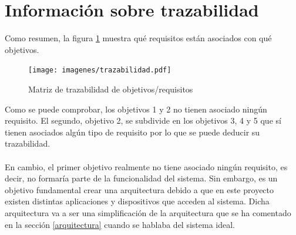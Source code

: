 \section{Información sobre trazabilidad}
Como resumen, la figura \ref{trazOBJ-R} muestra qué requisitos están asociados con qué objetivos.
\begin{figure}[H]
	\centering
	\texttt{[image: imagenes/trazabilidad.pdf]}
	\caption{Matriz de trazabilidad de objetivos/requisitos}
	\label{trazOBJ-R}
\end{figure}
Como se puede comprobar, los objetivos 1 y 2 no tienen asociado ningún requisito. El segundo, objetivo 2, se subdivide en los objetivos 3, 4 y 5 que sí tienen asociados algún tipo de requisito por lo que se puede deducir su trazabilidad. 
\\\\
En cambio, el primer objetivo realmente no tiene asociado ningún requisito, es decir, no formaría parte de la funcionalidad del sistema. Sin embargo, es un objetivo fundamental crear una arquitectura debido a que en este proyecto existen distintas aplicaciones y dispositivos que acceden al sistema. Dicha arquitectura va a ser una simplificación de la arquitectura que se ha comentado en la sección \ref{arquitectura} cuando se hablaba del sistema ideal. 

